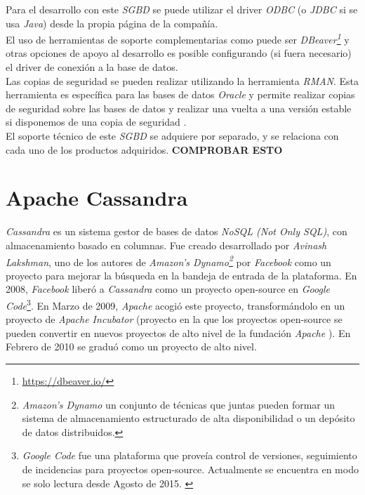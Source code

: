 \documentclass[11pt,a4paper]{article}
\begin{document}
Para el desarrollo con este \emph{SGBD} se puede utilizar el driver \emph{ODBC} (o \emph{JDBC} si se usa \emph{Java}) desde la propia página de la compañía. \\
El uso de herramientas de soporte complementarias como puede ser \emph{DBeaver\footnote{\url{https://dbeaver.io/}}} y otras opciones de apoyo al desarrollo es posible configurando (si fuera necesario) el driver de conexión a la base de datos. \\
Las copias de seguridad se pueden realizar utilizando la herramienta \emph{RMAN}. Esta herramienta es específica para las bases de datos \emph{Oracle} y permite realizar copias de seguridad sobre las bases de datos y realizar una vuelta a una versión estable si disponemos de una copia de seguridad \cite{ORA:8}. \\

El soporte técnico de este \emph{SGBD} se adquiere por separado, y se relaciona con cada uno de los productos adquiridos. \cite{ORA:4} \textbf{{\LARGE COMPROBAR ESTO}}\\

\newpage 

\section{Apache Cassandra}

\emph{Cassandra} es un sistema gestor de bases de datos \emph{NoSQL (Not Only SQL)}, con almacenamiento basado en columnas. Fue creado desarrollado por \emph{Avinash Lakshman}, uno de los autores de \emph{Amazon's Dynamo\footnote{\emph{Amazon's Dynamo} un conjunto de técnicas que juntas pueden formar un sistema de almacenamiento estructurado de alta disponibilidad o un depósito de datos distribuidos.\cite{WIKI:3}}} por \emph{Facebook} como un proyecto para mejorar la búsqueda en la bandeja de entrada de la plataforma. En 2008, \emph{Facebook} liberó a \emph{Cassandra} como un proyecto open-source en \emph{Google Code}\footnote{\emph{Google Code} fue una plataforma que proveía control de versiones, seguimiento de incidencias para proyectos open-source. Actualmente se encuentra en modo se solo lectura desde Agosto de 2015. \cite{WIKI:4}}. En Marzo de 2009, \emph{Apache} acogió este proyecto, transformándolo en un proyecto de \emph{Apache Incubator} (proyecto en la que los proyectos open-source se pueden convertir en nuevos proyectos de alto nivel de la fundación \emph{Apache} \cite{AP:1}). En Febrero de 2010 se graduó como un proyecto de alto nivel. \cite{WIKI:5}\\
\end{document}
